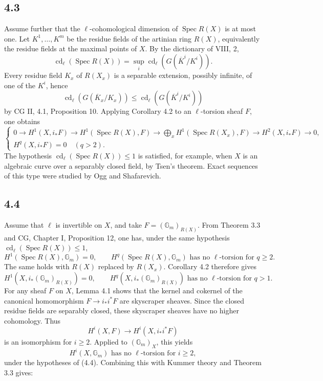 \documentclass[11pt]{article}
\newcommand{\Gm}{\mathbb{G}_m}
\newcommand{\Spec}{\operatorname{Spec}}
\begin{document}
\subsection*{4.3}
Assume further that the \(\ell\)-cohomological dimension of \(\Spec R(X)\) is at most one. Let \(K^1,\ldots,K^m\) be the residue fields of the artinian ring \(R(X)\), equivalently the residue fields at the maximal points of \(X\). By the dictionary of VIII, 2,
\[
\operatorname{cd}_\ell(\Spec R(X))=\sup_i\operatorname{cd}_\ell(G(\overline K^i/K^i)).
\]
Every residue field \(K_x\) of \(R(X_x)\) is a separable extension, possibly infinite, of one of the \(K^i\), hence
\[
\operatorname{cd}_\ell(G(\overline K_x/K_x))\leq \operatorname{cd}_\ell(G(\overline K^i/K^i))
\]
by CG II, 4.1, Proposition 10. Applying Corollary 4.2 to an \(\ell\)-torsion sheaf \(F\), one obtains
\[
\begin{cases}
0\to H^1(X,i_*F)\to H^1(\Spec R(X),F)\to \displaystyle\bigoplus_x H^1(\Spec R(X_x),F)\to H^2(X,i_*F)\to 0,\\
H^q(X,i_*F)=0\quad(q>2).
\end{cases}
\tag{4.3.1}
\]
The hypothesis \(\operatorname{cd}_\ell(\Spec R(X))\leq 1\) is satisfied, for example, when \(X\) is an algebraic curve over a separably closed field, by Tsen's theorem. Exact sequences of this type were studied by Ogg and Shafarevich.

\subsection*{4.4}
Assume that \(\ell\) is invertible on \(X\), and take \(F=(\Gm)_{R(X)}\). From Theorem 3.3 and CG, Chapter I, Proposition 12, one has, under the same hypothesis \(\operatorname{cd}_\ell(\Spec R(X))\leq 1\),
\[
H^1(\Spec R(X),\Gm)=0,
\qquad H^q(\Spec R(X),\Gm)\text{ has no }\ell\text{-torsion for }q\geq2.
\tag{4.4.1}
\]
The same holds with \(R(X)\) replaced by \(R(X_x)\). Corollary 4.2 therefore gives
\[
H^1(X,i_*(\Gm)_{R(X)})=0,
\qquad H^q(X,i_*(\Gm)_{R(X)})\text{ has no }\ell\text{-torsion for }q>1.
\tag{4.4.2}
\]
For any sheaf \(F\) on \(X\), Lemma 4.1 shows that the kernel and cokernel of the canonical homomorphism \(F\to i_*i^*F\) are skyscraper sheaves. Since the closed residue fields are separably closed, these skyscraper sheaves have no higher cohomology. Thus
\[
H^i(X,F)\longrightarrow H^i(X,i_*i^*F)
\]
is an isomorphism for \(i\geq2\). Applied to \((\Gm)_X\), this yields
\[
H^i(X,\Gm)\text{ has no }\ell\text{-torsion for }i\geq2,
\tag{4.5}
\]
under the hypotheses of (4.4). Combining this with Kummer theory and Theorem 3.3 gives:
\end{document}
